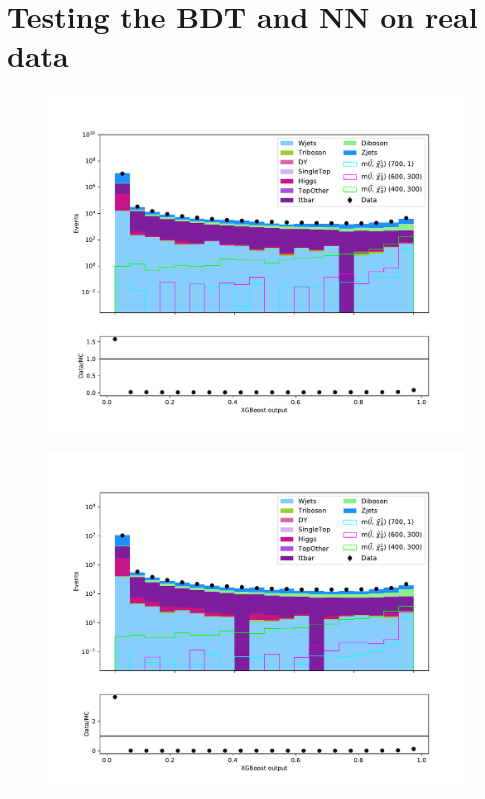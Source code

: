 \section{Testing the BDT and NN on real data}



\begin{figure}[H]
    \centering
        \includegraphics[width = \textwidth]{Figures/Stacked/stackedplot_BDT_All_level_slepslep.pdf}
        \caption{}
        \label{fig:traintestscaled}
\end{figure}

\begin{figure}[H]
    \centering
        \includegraphics[width = \textwidth]{Figures/Stacked/stackedplot_BDT_Low_level_slepslep.pdf}
        \caption{}
        \label{fig:traintestscaled}
\end{figure}

